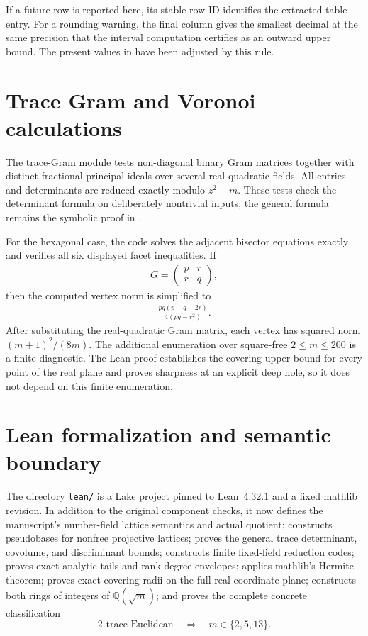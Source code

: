 \documentclass[12pt,a4paper]{amsart}
\theoremstyle{remark}
\theoremstyle{definition}
\begin{document}


If a future row is reported here, its stable row ID identifies the extracted
table entry.  For a rounding warning, the final column gives the smallest
decimal at the same precision that the interval computation certifies as an
outward upper bound.  The present values in 
have been adjusted by this rule.

\section{Trace Gram and Voronoi calculations}

The trace-Gram module tests non-diagonal binary Gram matrices together with
distinct fractional principal ideals over several real quadratic fields.  All
entries and determinants are reduced exactly modulo \(z^{2}-m\).  These tests
check the determinant formula on deliberately nontrivial inputs; the general
formula remains the symbolic proof in .

For the hexagonal case, the code solves the adjacent bisector equations exactly
and verifies all six displayed facet inequalities.  If
\begin{align*}
G=\begin{pmatrix}p&r\\r&q\end{pmatrix},
\end{align*}
then the computed vertex norm is simplified to
\begin{align*}
\frac{pq(p+q-2r)}{4(pq-r^{2})}.
\end{align*}
After substituting the real-quadratic Gram matrix, each vertex has squared norm
\((m+1)^{2}/(8m)\).  The additional enumeration over square-free
\(2\le m\le200\) is a finite diagnostic.  The Lean proof establishes the
covering upper bound for every point of the real plane and proves sharpness at
an explicit deep hole, so it does not depend on this finite enumeration.

\section{Lean formalization and semantic boundary}

The directory \nolinkurl{lean/} is a Lake project pinned to Lean~4.32.1 and a
fixed mathlib revision.  In addition to the original component checks, it now
defines the manuscript's number-field lattice semantics and actual quotient;
constructs pseudobases for nonfree projective lattices; proves the general
trace determinant, covolume, and discriminant bounds; constructs finite
fixed-field reduction codes; proves exact analytic tails and rank-degree
envelopes; applies mathlib's Hermite theorem; proves exact covering radii on
the full real coordinate plane; constructs both rings of integers of
\(\mathbb Q(\sqrt m)\); and proves the complete concrete classification
\[
  \text{2-trace Euclidean}\quad\Longleftrightarrow\quad
  m\in\{2,5,13\}.
\]
\end{document}
